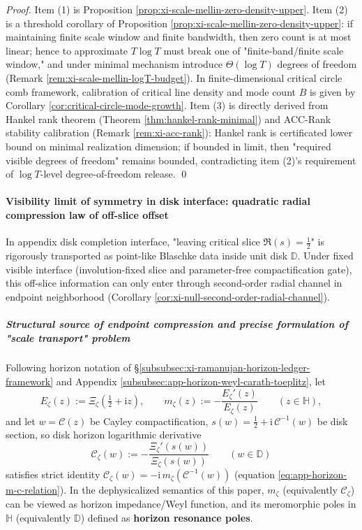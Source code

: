 \begin{proof}
Item (1) is Proposition \ref{prop:xi-scale-mellin-zero-density-upper}.
Item (2) is a threshold corollary of Proposition \ref{prop:xi-scale-mellin-zero-density-upper}: if maintaining finite scale window and finite bandwidth, then zero count is at most linear; hence to approximate \(T\log T\) must break one of "finite-band/finite scale window," and under minimal mechanism introduce \(\Theta(\log T)\) degrees of freedom (Remark \ref{rem:xi-scale-mellin-logT-budget}).
In finite-dimensional critical circle comb framework, calibration of critical line density and mode count \(B\) is given by Corollary \ref{cor:critical-circle-mode-growth}.
Item (3) is directly derived from Hankel rank theorem (Theorem \ref{thm:hankel-rank-minimal}) and ACC-Rank stability calibration (Remark \ref{rem:xi-acc-rank}): Hankel rank is certificated lower bound on minimal realization dimension; if bounded in limit, then "required visible degrees of freedom" remains bounded, contradicting item (2)'s requirement of \(\log T\)-level degree-of-freedom release. \qed
\end{proof}

\paragraph{Visibility limit of symmetry in disk interface: quadratic radial compression law of off-slice offset}
In appendix disk completion interface, "leaving critical slice \(\Re(s)=\tfrac12\)" is rigorously transported as point-like Blaschke data inside unit disk \(\mathbb{D}\).
Under fixed visible interface (involution-fixed slice and parameter-free compactification gate), this off-slice information can only enter through second-order radial channel in endpoint neighborhood (Corollary \ref{cor:xi-null-second-order-radial-channel}).

\subparagraph{Structural source of endpoint compression and precise formulation of "scale transport" problem}
Following horizon notation of \S\ref{subsubsec:xi-ramanujan-horizon-ledger-framework} and Appendix \ref{subsubsec:app-horizon-weyl-carath-toeplitz}, let
\[
E_{\zeta}(z):=\Xi_{\zeta}\!\left(\tfrac12+\mathrm{i}z\right),\qquad
m_{\zeta}(z):=-\frac{E_{\zeta}'(z)}{E_{\zeta}(z)}\qquad(z\in\mathbb{H}),
\]
and let \(w=\mathcal{C}(z)\) be Cayley compactification, \(s(w)=\tfrac12+\mathrm{i}\,\mathcal{C}^{-1}(w)\) be disk section, so disk horizon logarithmic derivative
\[
\mathscr{C}_{\zeta}(w):=-\frac{\Xi_{\zeta}'(s(w))}{\Xi_{\zeta}(s(w))}\qquad(w\in\mathbb{D})
\]
satisfies strict identity \(\mathscr{C}_{\zeta}(w)=-\mathrm{i}\,m_{\zeta}(\mathcal{C}^{-1}(w))\) (equation \eqref{eq:app-horizon-m-c-relation}).
In the dephysicalized semantics of this paper, \(m_{\zeta}\) (equivalently \(\mathscr{C}_{\zeta}\)) can be viewed as horizon impedance/Weyl function, and its meromorphic poles in \(\mathbb{H}\) (equivalently \(\mathbb{D}\)) defined as \textbf{horizon resonance poles}.

